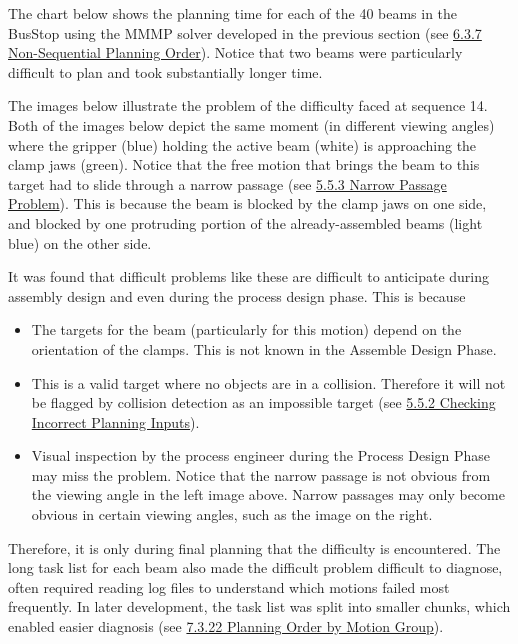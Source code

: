{The chart below \parencite{huangNewAnalogProtocol2021} shows the planning time for each of the 40 beams in the BusStop using the MMMP solver developed in the previous section (see \ul{6.3.7 Non-Sequential Planning Order}). Notice that two beams were particularly difficult to plan and took substantially longer time. 




The images below illustrate the problem of the difficulty faced at sequence 14. Both of the images below depict the same moment (in different viewing angles) where the gripper (blue) holding the active beam (white) is approaching the clamp jaws (green). Notice that the free motion that brings the beam to this target had to slide through a narrow passage (see \ul{5.5.3 Narrow Passage Problem}). This is because the beam is blocked by the clamp jaws on one side, and blocked by one protruding portion of the already-assembled beams (light blue) on the other side.




It was found that difficult problems like these are difficult to anticipate during assembly design and even during the process design phase. This is because 

\begin{itemize}
	\item The targets for the beam (particularly for this motion) depend on the orientation of the clamps. This is not known in the Assemble Design Phase.

	\item This is a valid target where no objects are in a collision. Therefore it will not be flagged by collision detection as an impossible target (see \ul{5.5.2 Checking Incorrect Planning Inputs}).

	\item Visual inspection by the process engineer during the Process Design Phase may miss the problem. Notice that the narrow passage is not obvious from the viewing angle in the left image above. Narrow passages may only become obvious in certain viewing angles, such as the image on the right.

\end{itemize}
Therefore, it is only during final planning that the difficulty is encountered. The long task list for each beam also made the difficult problem difficult to diagnose, often required reading log files to understand which motions failed most frequently. In later development, the task list was split into smaller chunks, which enabled easier diagnosis (see \ul{7.3.22 Planning Order by Motion Group}). 

}
